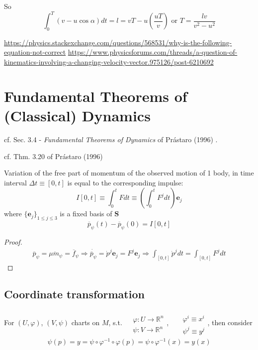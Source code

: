So
\begin{equation}
	\int_0^T (v-u\cos{\alpha}) dt = l = vT - u \left( \frac{u T}{v} \right) \text{ or } \boxed{ T = \frac{lv}{ v^2 - u^2 } }
\end{equation}

\url{https://physics.stackexchange.com/questions/568531/why-is-the-following-equation-not-correct}
\url{https://www.physicsforums.com/threads/a-question-of-kinematics-involving-a-changing-velocity-vector.975126/post-6210692}

\section{Fundamental Theorems of (Classical) Dynamics}

cf. Sec. 3.4 - \emph{Fundamental Theorems of Dynamics} of Pr\'{a}staro (1996) \cite{dgdt:Pras1996}.

cf. Thm. 3.20 of Pr\'{a}staro (1996) \cite{dgdt:Pras1996}
\begin{theorem}
	Variation of the free part of momentum of the observed motion of 1 body, in time interval $\Delta t \equiv [0, t]$ is equal to the corresponding impulse:
	\begin{equation}
	I[0,t] \equiv \int_0^t Fdt \equiv \left( \int_0^t F^j dt \right) \mathbf{e}_j
	\end{equation}
	where $\lbrace \mathbf{e}_j \rbrace_{1 \leq j \leq 3}$ is a fixed basis of $\mathbf{S}$
	\begin{equation}
		\overline{p}_{\psi}(t) - \overline{p}_{\psi}(0) = I[0,t]
	\end{equation}
\end{theorem}

\begin{proof}
	\[
\begin{gathered}
\overline{p}_{\psi} = \mu \ddot{m}_{\psi} = \overline{f}_{\psi} \Longrightarrow \dot{ \overline{p}_{\psi}} = \dot{p}^j \mathbf{e}_j = F^j \textbf{e}_j \Longrightarrow \int_{[0,t]} \dot{p}^j dt = \int_{[0,t]}F^j dt
\end{gathered}
	\]
	\end{proof}

\subsection{Coordinate transformation}

For $(U, \varphi)$, $(V, \psi)$ charts on $M$, s.t. $\begin{aligned} & \quad \\ 
	& \varphi : U \to \mathbb{R}^n \\
	 & \psi: V \to \mathbb{R}^n \end{aligned}$, \quad \, $\begin{aligned} & \quad \\ 
	 & \varphi^i \equiv x^i \\
	 & \psi^j \equiv y^j \end{aligned}$, then consider 
\[
\begin{gathered}
\psi(p) = y = \psi \circ \varphi^{-1} \circ \varphi(p) = \psi \circ \varphi^{-1}(x) = y(x)
\end{gathered}  
\]

